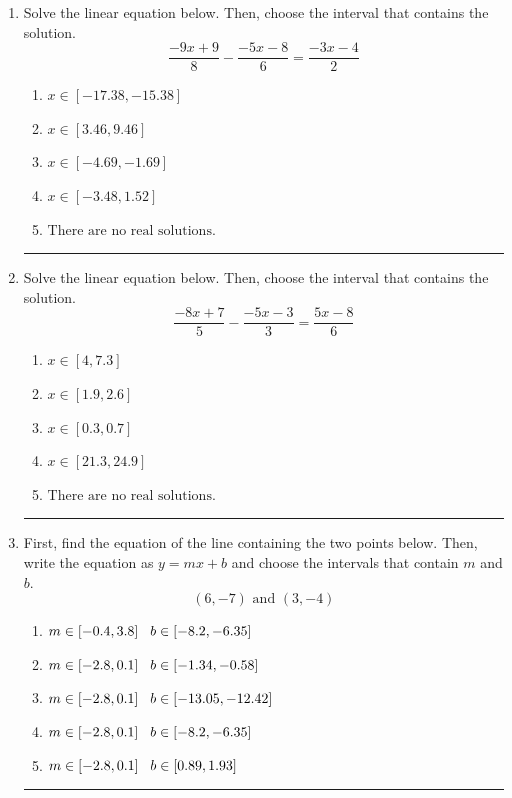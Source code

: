 \documentclass[14pt]{extbook}
\newcommand{\litem}[1]{\item#1\hspace*{-1cm}\rule{\textwidth}{0.4pt}}
\begin{document}
\begin{enumerate}
{\begin{enumerate}[label=\Alph*.]
\end{enumerate} }
\litem{
Solve the linear equation below. Then, choose the interval that contains the solution.\[ \frac{-9x + 9}{8} - \frac{-5x -8}{6} = \frac{-3x -4}{2} \]\begin{enumerate}[label=\Alph*.]
\item \( x \in [-17.38, -15.38] \)
\item \( x \in [3.46, 9.46] \)
\item \( x \in [-4.69, -1.69] \)
\item \( x \in [-3.48, 1.52] \)
\item \( \text{There are no real solutions.} \)

\end{enumerate} }
\litem{
Solve the linear equation below. Then, choose the interval that contains the solution.\[ \frac{-8x + 7}{5} - \frac{-5x -3}{3} = \frac{5x -8}{6} \]\begin{enumerate}[label=\Alph*.]
\item \( x \in [4, 7.3] \)
\item \( x \in [1.9, 2.6] \)
\item \( x \in [0.3, 0.7] \)
\item \( x \in [21.3, 24.9] \)
\item \( \text{There are no real solutions.} \)

\end{enumerate} }
\litem{
First, find the equation of the line containing the two points below. Then, write the equation as $ y=mx+b $ and choose the intervals that contain $m$ and $b$.\[ (6, -7) \text{ and } (3, -4) \]\begin{enumerate}[label=\Alph*.]
\item \( m \in [-0.4, 3.8] \hspace*{3mm} b \in [-8.2, -6.35] \)
\item \( m \in [-2.8, 0.1] \hspace*{3mm} b \in [-1.34, -0.58] \)
\item \( m \in [-2.8, 0.1] \hspace*{3mm} b \in [-13.05, -12.42] \)
\item \( m \in [-2.8, 0.1] \hspace*{3mm} b \in [-8.2, -6.35] \)
\item \( m \in [-2.8, 0.1] \hspace*{3mm} b \in [0.89, 1.93] \)

\end{enumerate} }
\end{enumerate}
\end{document}
